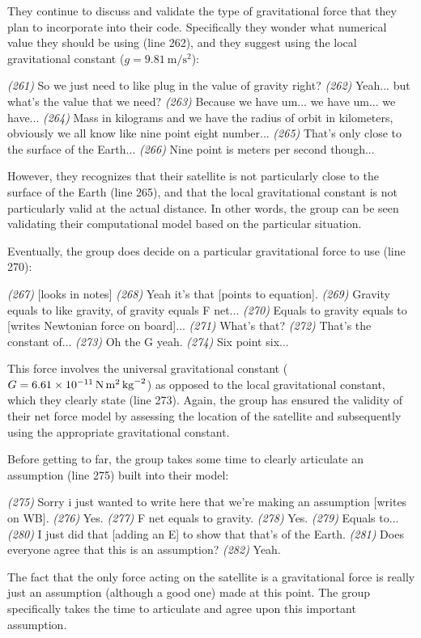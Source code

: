 \documentclass{msuphddissertation}
\begin{document}
\begin{doublespace}
They continue to discuss and validate the type of gravitational force that they plan to incorporate into their code.  Specifically they wonder what numerical value they should be using (line 262), and they suggest using the local gravitational constant ($g=\SI{9.81}{\meter\per\second\squared}$):
\begin{description}
\SD \textit{(261)} So we just need to like plug in the value of gravity right?
\SA \textit{(262)} Yeah... but what's the value that we need?
\SA \textit{(263)} Because we have um... we have um... we have...
\SA \textit{(264)} Mass in kilograms and we have {the radius of orbit in} kilometers, obviously we all know like nine point eight number...
\SC \textit{(265)} That's {only} close to {the surface of the Earth}...	
\SA \textit{(266)} Nine point is meters per second though...\end{description}  However, they recognizes that their satellite is not particularly close to the surface of the Earth (line 265), and that the local gravitational constant is not particularly valid at the actual distance.  In other words, the group can be seen validating their computational model based on the particular situation.

Eventually, the group does decide on a particular gravitational force to use (line 270):
\begin{description}		
\SC \textit{(267)} [looks in notes]
\SD \textit{(268)} Yeah it's that [points to equation].
\SD \textit{(269)} Gravity equals to like gravity, of gravity equals F net...
\SD \textit{(270)} Equals to gravity equals to [writes Newtonian force on board]...
\SB	\textit{(271)} What's that?		
\SD \textit{(272)} That's the constant of...
\SB	\textit{(273)} Oh the G yeah.		
\SB	\textit{(274)} Six point six...\end{description}  This force involves the universal gravitational constant ($G=\SI{6.61E-11}{\newton\meter\squared\per\kilo\gram\squared}$) as opposed to the local gravitational constant, which they clearly state (line 273).  Again, the group has ensured the validity of their net force model by assessing the location of the satellite and subsequently using the appropriate gravitational constant.

Before getting to far, the group takes some time to clearly articulate an assumption (line 275) built into their model:
\begin{description}
\SA \textit{(275)} Sorry i just wanted to write here that we're making an assumption [writes on WB].
\SD \textit{(276)} Yes.
\SD \textit{(277)} F net equals to gravity.
\SD \textit{(278)} Yes.
\SD \textit{(279)} Equals to...
\SA \textit{(280)} I just did that [adding an E] to show that that's of the Earth.
\SA \textit{(281)} Does everyone agree that this is an assumption?	
\SC \textit{(282)} Yeah.
\end{description}  The fact that the only force acting on the satellite is a gravitational force is really just an assumption (although a good one) made at this point.  The group specifically takes the time to articulate and agree upon this important assumption.


\end{doublespace}
\end{document}
